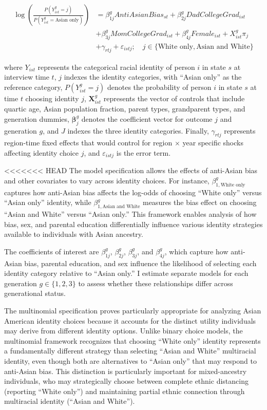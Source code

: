 \begin{align}
\log\left(\frac{P(Y_{ist}^g = j)}{P(Y_{ist}^g = \text{Asian only})}\right) &= \beta_{1j}^g AntiAsianBias_{st} + \beta_{2j}^g DadCollegeGrad_{ist}\nonumber \\ 
& + \beta_{3j}^g MomCollegeGrad_{ist} + \beta_{4j}^g Female_{ist} + X_{ist}^g\pi_j  \nonumber \\ 
& + \gamma_{rtj} + \varepsilon_{istj}; \quad j \in \{\text{White only}, \text{Asian and White}\} \label{eq:multinomial_logit}
\end{align}

where $Y_{ist}$ represents the categorical racial identity of person $i$ in state $s$ at interview time $t$, $j$ indexes the identity categories, with ``Asian only'' as the reference category, $P(Y_{ist}^g = j)$ denotes the probability of person $i$ in state $s$ at time $t$ choosing identity $j$, $\mathbf{X}_{ist}^g$ represents the vector of controls that include quartic age, Asian population fraction, parent types, grandparent types, and generation dummies, $\boldsymbol{\beta}_j^g$ denotes the coefficient vector for outcome $j$ and generation $g$, and $J$ indexes the three identity categories. Finally, $\gamma_{rtj}$ represents region-time fixed effects that would control for region $\times$ year specific shocks affecting identity choice $j$, and $\varepsilon_{istj}$ is the error term.

<<<<<<< HEAD
The model specification allows the effects of anti-Asian bias and other covariates to vary across identity choices. For instance, $\beta_{1,\text{White only}}^g$ captures how anti-Asian bias affects the log-odds of choosing ``White only'' versus ``Asian only'' identity, while $\beta_{1,\text{Asian and White}}^g$ measures the bias effect on choosing ``Asian and White'' versus ``Asian only.'' This framework enables analysis of how bias, sex, and parental education differentially influence various identity strategies available to individuals with Asian ancestry.

The coefficients of interest are $\beta_{1j}^g$, $\beta_{2j}^g$, $\beta_{3j}^g$, and $\beta_{4j}^g$, which capture how anti-Asian bias, parental education, and sex influence the likelihood of selecting each identity category relative to ``Asian only.'' I estimate separate models for each generation $g \in \{1,2,3\}$ to assess whether these relationships differ across generational status.

The multinomial specification proves particularly appropriate for analyzing Asian American identity choices because it accounts for the distinct utility individuals may derive from different identity options. Unlike binary choice models, the multinomial framework recognizes that choosing ``White only'' identity represents a fundamentally different strategy than selecting ``Asian and White'' multiracial identity, even though both are alternatives to ``Asian only'' that may respond to anti-Asian bias. This distinction is particularly important for mixed-ancestry individuals, who may strategically choose between complete ethnic distancing (reporting ``White only'') and maintaining partial ethnic connection through multiracial identity (``Asian and White'').

